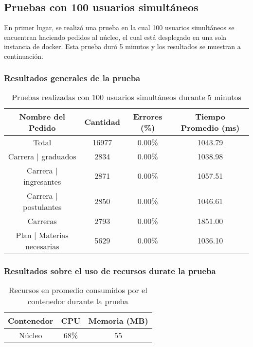 \break
\subsection{Pruebas con 100 usuarios simultáneos}
En primer lugar, se realizó una prueba en la cual 100 usuarios simultáneos se encuentran haciendo pedidos al núcleo, el cual está desplegado en una sola instancia de docker.
Esta prueba duró 5 minutos y los resultados se muestran a continuación.


\subsubsection{Resultados generales de la prueba}
\begin{table}[!htbp]
    \centering
    \makegapedcells
    \begin{tabular}{|c|c|c|c|}
    \hline
    Nombre del Pedido & Cantidad & Errores (\%) & Tiempo Promedio (ms) \\ \hline
    Total & 16977 & 0.00\% & 1043.79\\ \hline
    Carrera | graduados & 2834 & 0.00\% & 1038.98\\ \hline
    Carrera | ingresantes & 2871 & 0.00\% & 1057.51\\ \hline
    Carrera | postulantes & 2850 & 0.00\% & 1046.61\\ \hline
    Carreras & 2793 & 0.00\% & 1851.00\\ \hline
    Plan | Materias necesarias & 5629 & 0.00\% & 1036.10\\ \hline
    
    \end{tabular}
    \caption{Pruebas realizadas con 100 usuarios simultáneos durante 5 minutos}
    \label{tab:tabla_planes}
\end{table}

\subsubsection{Resultados sobre el uso de recursos durate la prueba}
\begin{table}[!htbp]
    \centering
    \makegapedcells
    \begin{tabular}{|c|c|c|}
    \hline
    Contenedor & CPU & Memoria (MB)\\ \hline
    Núcleo & 68\% & 55 \\ \hline
    \end{tabular}
    \caption{Recursos en promedio consumidos por el contenedor durante la prueba}
    \label{tab:tabla_planes}
\end{table}

